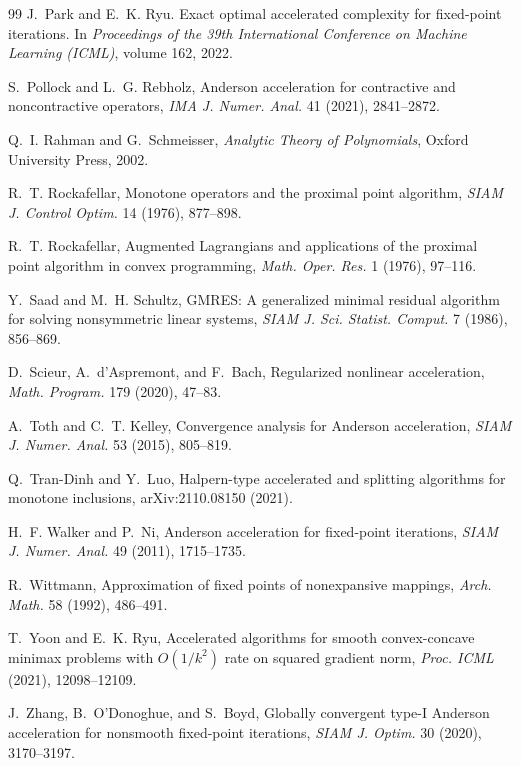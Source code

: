 \documentclass[11pt]{article}
\theoremstyle{definition}
\theoremstyle{remark}
\begin{document}
\begin{thebibliography}{99}
J.~Park and E.~K. Ryu.
\newblock Exact optimal accelerated complexity for fixed-point iterations.
\newblock In \emph{Proceedings of the 39th International Conference on
  Machine Learning (ICML)}, volume 162, 2022.

S.~Pollock and L.~G. Rebholz, Anderson acceleration for contractive and
noncontractive operators, \emph{IMA J. Numer. Anal.} 41 (2021),
2841--2872.

Q.~I. Rahman and G.~Schmeisser, \emph{Analytic Theory of Polynomials},
Oxford University Press, 2002.

R.~T. Rockafellar, Monotone operators and the proximal point algorithm,
\emph{SIAM J. Control Optim.} 14 (1976), 877--898.

R.~T. Rockafellar, Augmented Lagrangians and applications of the proximal
point algorithm in convex programming, \emph{Math. Oper. Res.} 1 (1976),
97--116.

Y.~Saad and M.~H. Schultz, GMRES: A generalized minimal residual algorithm
for solving nonsymmetric linear systems, \emph{SIAM J. Sci. Statist.
Comput.} 7 (1986), 856--869.

D.~Scieur, A.~d'Aspremont, and F.~Bach, Regularized nonlinear
acceleration, \emph{Math. Program.} 179 (2020), 47--83.

A.~Toth and C.~T. Kelley, Convergence analysis for Anderson acceleration,
\emph{SIAM J. Numer. Anal.} 53 (2015), 805--819.

Q.~Tran-Dinh and Y.~Luo, Halpern-type accelerated and splitting algorithms
for monotone inclusions, arXiv:2110.08150 (2021).

H.~F. Walker and P.~Ni, Anderson acceleration for fixed-point iterations,
\emph{SIAM J. Numer. Anal.} 49 (2011), 1715--1735.

R.~Wittmann, Approximation of fixed points of nonexpansive mappings,
\emph{Arch. Math.} 58 (1992), 486--491.

T.~Yoon and E.~K. Ryu, Accelerated algorithms for smooth convex-concave
minimax problems with $O(1/k^2)$ rate on squared gradient norm,
\emph{Proc. ICML} (2021), 12098--12109.

J.~Zhang, B.~O'Donoghue, and S.~Boyd, Globally convergent type-I Anderson
acceleration for nonsmooth fixed-point iterations, \emph{SIAM J. Optim.}
30 (2020), 3170--3197.

\end{thebibliography}
\end{document}
